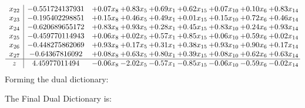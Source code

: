 \documentclass[8pt]{article}
\begin{document}
\[\begin{array}{c| c c@{\hskip 2pt} c@{\hskip 2pt} c@{\hskip 2pt} c@{\hskip 2pt} c@{\hskip 2pt} c@{\hskip 2pt} c@{\hskip 2pt} }
 x_{22}   &  -0.551724137931 & +  0.07 x_{8} & +  0.83 x_{5} & +  0.69 x_{1} & +  0.62 x_{15} & +  0.07 x_{10} & +  0.10 x_{6} & +  0.83 x_{14}\\
 x_{23}   &  -0.195402298851 & +  0.15 x_{8} & +  0.46 x_{5} & +  0.49 x_{1} & +  0.01 x_{15} & +  0.15 x_{10} & +  0.72 x_{6} & +  0.46 x_{14}\\
 x_{24}   &  -0.620689655172 & +  0.83 x_{8} & +  0.93 x_{5} & +  0.28 x_{1} & +  0.45 x_{15} & +  0.83 x_{10} & +  0.24 x_{6} & +  0.93 x_{14}\\
 x_{25}   &  -0.459770114943 & +  0.06 x_{8} & +  0.02 x_{5} & +  0.57 x_{1} & +  0.85 x_{15} & +  0.06 x_{10} & +  0.59 x_{6} & +  0.02 x_{14}\\
 x_{26}   &  -0.448275862069 & +  0.93 x_{8} & +  0.17 x_{5} & +  0.31 x_{1} & +  0.38 x_{15} & +  0.93 x_{10} & +  0.90 x_{6} & +  0.17 x_{14}\\
 x_{27}   &  -0.64367816092 & +  0.08 x_{8} & +  0.63 x_{5} & +  0.80 x_{1} & +  0.39 x_{15} & +  0.08 x_{10} & +  0.62 x_{6} & +  0.63 x_{14}\\
\hline
z    &  4.45977011494 & -0.06 x_{8} & -2.02 x_{5} & -0.57 x_{1} & -0.85 x_{15} & -0.06 x_{10} & -0.59 x_{6} & -0.02 x_{14}\\
\end{array}\]
Forming the dual dictionary:

The Final Dual Dictionary is: 
\end{document}
